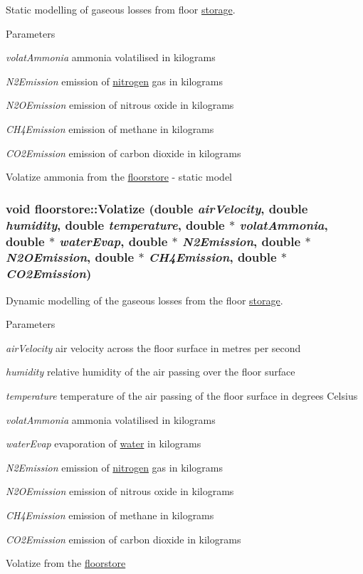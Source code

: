 Static modelling of gaseous losses from floor \hyperlink{classstorage}{storage}. 
\begin{DoxyParams}{Parameters}
\item[{\em volatAmmonia}]ammonia volatilised in kilograms \item[{\em N2Emission}]emission of \hyperlink{classnitrogen}{nitrogen} gas in kilograms \item[{\em N2OEmission}]emission of nitrous oxide in kilograms \item[{\em CH4Emission}]emission of methane in kilograms \item[{\em CO2Emission}]emission of carbon dioxide in kilograms\end{DoxyParams}
Volatize ammonia from the \hyperlink{classfloorstore}{floorstore} -\/ static model \hypertarget{classfloorstore_ae328e740c794853624644db230175f0c}{
\subsubsection[{Volatize}]{\setlength{\rightskip}{0pt plus 5cm}void floorstore::Volatize (double {\em airVelocity}, \/  double {\em humidity}, \/  double {\em temperature}, \/  double $\ast$ {\em volatAmmonia}, \/  double $\ast$ {\em waterEvap}, \/  double $\ast$ {\em N2Emission}, \/  double $\ast$ {\em N2OEmission}, \/  double $\ast$ {\em CH4Emission}, \/  double $\ast$ {\em CO2Emission})}}
\label{classfloorstore_ae328e740c794853624644db230175f0c}


Dynamic modelling of the gaseous losses from the floor \hyperlink{classstorage}{storage}. 
\begin{DoxyParams}{Parameters}
\item[{\em airVelocity}]air velocity across the floor surface in metres per second \item[{\em humidity}]relative humidity of the air passing over the floor surface \item[{\em temperature}]temperature of the air passing of the floor surface in degrees Celsius \item[{\em volatAmmonia}]ammonia volatilised in kilograms \item[{\em waterEvap}]evaporation of \hyperlink{classwater}{water} in kilograms \item[{\em N2Emission}]emission of \hyperlink{classnitrogen}{nitrogen} gas in kilograms \item[{\em N2OEmission}]emission of nitrous oxide in kilograms \item[{\em CH4Emission}]emission of methane in kilograms \item[{\em CO2Emission}]emission of carbon dioxide in kilograms\end{DoxyParams}
Volatize from the \hyperlink{classfloorstore}{floorstore} 

